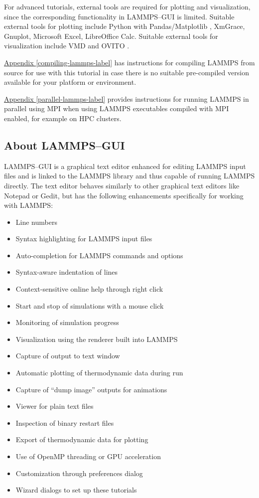 \documentclass[9pt,tutorial]{livecoms}
\begin{document}
For advanced tutorials, external tools are required for plotting and
visualization, since the corresponding functionality in LAMMPS--GUI is
limited.  Suitable external tools for plotting include Python with
Pandas/Matplotlib \cite{van1995python,hunter2007Matplotlib}, XmGrace,
Gnuplot, Microsoft Excel, LibreOffice Calc.  Suitable external tools for
visualization include VMD \cite{vmd_home,humphrey1996vmd} and OVITO
\cite{ovito_home,ovito_paper}.

\hyperref[compiling-lammps-label]{Appendix \ref{compiling-lammps-label}}
has instructions for compiling LAMMPS from source for use with this
tutorial in case there is no suitable pre-compiled version available
for your platform or environment.

\hyperref[parallel-lammps-label]{Appendix \ref{parallel-lammps-label}}
provides instructions for running LAMMPS in parallel using MPI when
using LAMMPS executables compiled with MPI enabled, for example on HPC
clusters.

\subsection{About LAMMPS--GUI}

LAMMPS--GUI is a graphical text editor enhanced for editing LAMMPS input
files and is linked to the LAMMPS library and thus capable of running
LAMMPS directly.  The text editor behaves similarly to other graphical
text editors like Notepad or Gedit, but has the following enhancements
specifically for working with LAMMPS:
\begin{itemize}
\item Line numbers
\item Syntax highlighting for LAMMPS input files
\item Auto-completion for LAMMPS commands and options
\item Syntax-aware indentation of lines
\item Context-sensitive online help through right click
\item Start and stop of simulations with a mouse click
\item Monitoring of simulation progress
\item Visualization using the renderer built into LAMMPS
\item Capture of output to text window
\item Automatic plotting of thermodynamic data during run
\item Capture of ``dump image'' outputs for animations
\item Viewer for plain text files
\item Inspection of binary restart files
\item Export of thermodynamic data for plotting
\item Use of OpenMP threading or GPU acceleration
\item Customization through preferences dialog
\item Wizard dialogs to set up these tutorials
\end{itemize}
\end{document}
